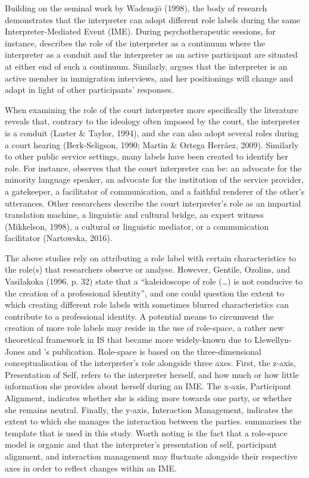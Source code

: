 \documentclass[output=paper]{langsci/langscibook}
\begin{document}
Building on the seminal work by Wadensjö (1998), the body of research demonstrates that the interpreter can adopt different role labels during the same Interpreter-Mediated Event (IME). During psychotherapeutic sessions, \citet{Bot2009} for instance, describes the role of the interpreter as a continuum where the interpreter as a conduit and the interpreter as an active participant are situated at either end of such a continuum. Similarly, \citet{Mason2009} argues that the interpreter is an active member in immigration interviews, and her positionings will change and adapt in light of other participants’ responses. 

When examining the role of the court interpreter more specifically the literature reveals that, contrary to the ideology often imposed by the court, the interpreter is a conduit (Laster \& Taylor, 1994), and she can also adopt several roles during a court hearing (Berk-Seligson, 1990; Martin \& Ortega Herráez, 2009). Similarly to other public service settings, many labels have been created to identify her role. For instance, \citet{Hale2008} observes that the court interpreter can be: an advocate for the minority language speaker, an advocate for the institution of the service provider, a gatekeeper, a facilitator of communication, and a faithful renderer of the other’s utterances. Other researchers describe the court interpreter’s role as an impartial translation machine, a linguistic and cultural bridge, an expert witness (Mikkelson, 1998), a cultural or linguistic mediator, or a communication facilitator (Nartowska, 2016).

The above studies rely on attributing a role label with certain characteristics to the role(s) that researchers observe or analyse. However, Gentile, Ozolins, and Vasilakoka (1996, p. 32) state that a “kaleidoscope of role (…) is not conducive to the creation of a professional identity”, and one could question the extent to which creating different role labels with sometimes blurred characteristics can contribute to a professional identity. A potential means to circumvent the creation of more role labels may reside in the use of role-space, a rather new theoretical framework in IS that became more widely-known due to Llewellyn-Jones and \citet{Lee2014}’s publication. Role-space is based on the three-dimensional conceptualisation of the interpreter’s role alongside three axes. First, the z-axis, Presentation of Self, refers to the interpreter herself, and how much or how little information she provides about herself during an IME. The x-axis, Participant Alignment, indicates whether she is siding more towards one party, or whether she remains neutral. Finally, the y-axis, Interaction Management, indicates the extent to which she manages the interaction between the parties.  summarises the template that is used in this study. Worth noting is the fact that a role-space model is organic and that the interpreter’s presentation of self, participant alignment, and interaction management may fluctuate alongside their respective axes in order to reflect changes within an IME.
\end{document}
